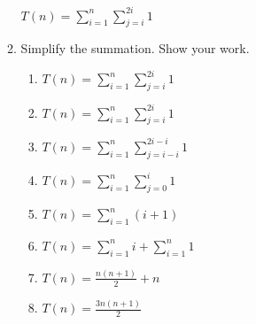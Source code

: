 \documentclass[12pt]{article}
\begin{document}
\begin{enumerate}
\begin{enumerate}
            $T(n) = \sum_{i=1}^{n} \sum_{j=i}^{2i} 1$

            \item Simplify the summation. Show your work.
                \begin{enumerate}
                    \item $T(n) = \sum_{i=1}^{n} \sum_{j=i}^{2i} 1$
                    \item $T(n) = \sum_{i=1}^{n} \sum_{j=i}^{2i} 1$
                    \item $T(n) = \sum_{i=1}^{n} \sum_{j=i-i}^{2i-i} 1$
                    \item $T(n) = \sum_{i=1}^{n} \sum_{j=0}^{i} 1$
                    \item $T(n) = \sum_{i=1}^{n}( i + 1)$
                    \item $T(n) = \sum_{i=1}^{n} i + \sum_{i=1}^{n} 1$
                    \item $T(n) = \frac{n(n+1)}{2} + n$
                    \item $T(n) = \frac{3n(n+1)}{2}$
                \end{enumerate}
        \end{enumerate}


\end{enumerate}
\end{document}
